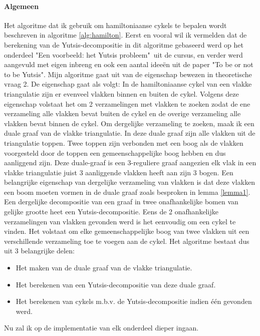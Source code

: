 \documentclass[11pt, a4paper, table]{article}
\theoremstyle{definition}
\theoremstyle{definition}
\theoremstyle{definition}
\begin{document}
\paragraph{Algemeen}
Het algoritme dat ik gebruik om hamiltoniaanse cykels te bepalen wordt beschreven in algoritme \ref{alg:hamilton}. Eerst en vooral wil ik vermelden dat de berekening van de Yutsis-decompositie in dit algoritme gebaseerd werd op het onderdeel "Een voorbeeld: het Yutsis probleem"\ uit de cursus, en verder werd aangevuld met eigen inbreng en ook een aantal idee\"{e}n uit de paper "To be or not to be Yutsis". Mijn algoritme gaat uit van de eigenschap bewezen in theoretische vraag 2.  De eigenschap gaat als volgt: In de hamiltoniaanse cykel van een vlakke triangulatie zijn er evenveel vlakken binnen en buiten de cykel. Volgens deze eigenschap volstaat het om 2 verzamelingen met vlakken te zoeken zodat de ene verzameling alle vlakken bevat buiten de cykel en de overige verzameling alle vlakken bevat binnen de cykel. Om dergelijke verzameling te zoeken, maak ik een duale graaf van de vlakke triangulatie. In deze duale graaf zijn alle vlakken uit de triangulatie toppen. Twee toppen zijn verbonden met een boog als de vlakken voorgesteld door de toppen een gemeenschappelijke boog hebben en dus aanliggend zijn. Deze duale-graaf is een 3-reguliere graaf aangezien elk vlak in een vlakke triangulatie juist 3 aanliggende vlakken heeft aan zijn 3 bogen. Een belangrijke eigenschap van dergelijke verzameling van vlakken is dat deze vlakken een boom moeten vormen in de duale graaf zoals besproken in lemma \ref{lemma1}. Een dergelijke decompositie van een graaf in twee onafhankelijke bomen van gelijke grootte heet een Yutsis-decompositie. Eens de 2 onafhankelijke verzamelingen van vlakken gevonden werd is het eenvoudig om een cykel te vinden. Het volstaat om elke gemeenschappelijke boog van twee vlakken uit een verschillende verzameling toe te voegen aan de cykel. 
Het algoritme bestaat dus uit 3 belangrijke delen:
\begin{itemize}
	\item Het maken van de duale graaf van de vlakke triangulatie. 
	\item Het berekenen van een Yutsis-decompositie van deze duale graaf. 
	\item Het berekenen van cykels m.b.v. de Yutsis-decompositie indien \'{e}\'{e}n gevonden werd. 
\end{itemize}
Nu zal ik op de implementatie van elk onderdeel dieper ingaan. 
\end{document}
